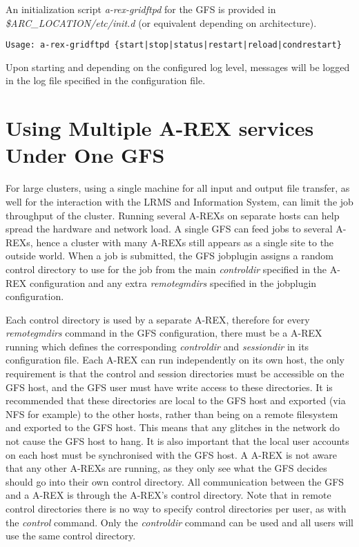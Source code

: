 \documentclass{article}
\begin{document}
An initialization script \emph{a-rex-gridftpd} for the GFS is provided
in \emph{\$ARC\_LOCATION/etc/init.d} (or equivalent depending on
architecture).

\begin{verbatim}
Usage: a-rex-gridftpd {start|stop|status|restart|reload|condrestart}
\end{verbatim}

Upon starting and depending on the configured log level, messages will
be logged in the log file specified in the configuration file.


\section{Using Multiple A-REX services Under One GFS\label{sub:Multiarex}}

For large clusters, using a single machine for all input and output
file transfer, as well for the interaction with the LRMS and
Information System, can limit the job throughput of the
cluster. Running several A-REXs on separate hosts can help spread the
hardware and network load. A single GFS can feed jobs to several A-REXs,
hence a cluster with many A-REXs still appears as a single site to the
outside world. When a job is submitted, the GFS jobplugin assigns a
random control directory to use for the job from the main
\emph{controldir} specified in the A-REX configuration and any extra
\emph{remotegmdirs} specified in the jobplugin configuration.

Each control directory is used by a separate A-REX, therefore for every
\emph{remotegmdirs} command in the GFS configuration, there must be a
A-REX running which defines the corresponding \emph{controldir} and
\emph{sessiondir} in its configuration file. Each A-REX can run
independently on its own host, the only requirement is that the
control and session directories must be accessible on the GFS host,
and the GFS user must have write access to these directories. It is
recommended that these directories are local to the GFS host and
exported (via NFS for example) to the other hosts, rather than being
on a remote filesystem and exported to the GFS host. This means that
any glitches in the network do not cause the GFS host to hang. It is
also important that the local user accounts on each host must be
synchronised with the GFS host. A A-REX is not aware that any other A-REXs
are running, as they only see what the GFS decides should go into
their own control directory. All communication between the GFS and a
A-REX is through the A-REX's control directory. Note that in remote control
directories there is no way to specify control directories per user,
as with the \emph{control} command. Only the \emph{controldir} command
can be used and all users will use the same control directory.
\end{document}
